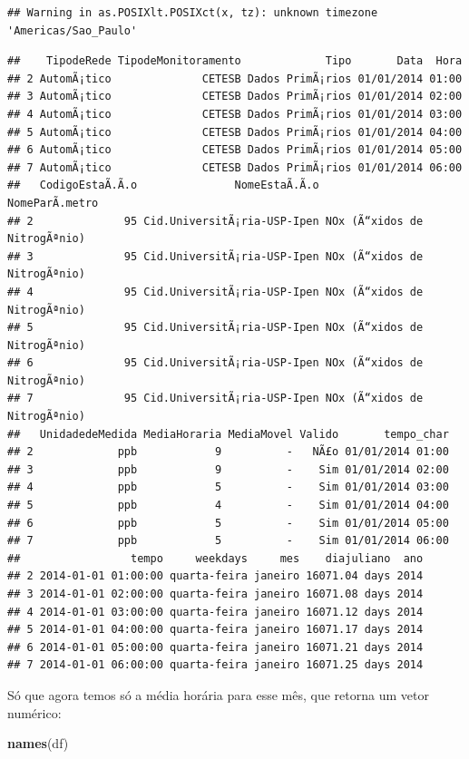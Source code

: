 \documentclass[]{book}
\newenvironment{Shaded}{\begin{snugshade}}{\end{snugshade}}
\newcommand{\KeywordTok}[1]{\textcolor[rgb]{0.13,0.29,0.53}{\textbf{#1}}}
\newcommand{\NormalTok}[1]{#1}
\theoremstyle{definition}
\theoremstyle{definition}
\theoremstyle{definition}
\theoremstyle{remark}
\begin{document}
\begin{verbatim}
## Warning in as.POSIXlt.POSIXct(x, tz): unknown timezone 'Americas/Sao_Paulo'
\end{verbatim}

\begin{verbatim}
##    TipodeRede TipodeMonitoramento             Tipo       Data  Hora
## 2 AutomÃ¡tico              CETESB Dados PrimÃ¡rios 01/01/2014 01:00
## 3 AutomÃ¡tico              CETESB Dados PrimÃ¡rios 01/01/2014 02:00
## 4 AutomÃ¡tico              CETESB Dados PrimÃ¡rios 01/01/2014 03:00
## 5 AutomÃ¡tico              CETESB Dados PrimÃ¡rios 01/01/2014 04:00
## 6 AutomÃ¡tico              CETESB Dados PrimÃ¡rios 01/01/2014 05:00
## 7 AutomÃ¡tico              CETESB Dados PrimÃ¡rios 01/01/2014 06:00
##   CodigoEstaÃ.Ã.o               NomeEstaÃ.Ã.o               NomeParÃ.metro
## 2              95 Cid.UniversitÃ¡ria-USP-Ipen NOx (Ã“xidos de NitrogÃªnio)
## 3              95 Cid.UniversitÃ¡ria-USP-Ipen NOx (Ã“xidos de NitrogÃªnio)
## 4              95 Cid.UniversitÃ¡ria-USP-Ipen NOx (Ã“xidos de NitrogÃªnio)
## 5              95 Cid.UniversitÃ¡ria-USP-Ipen NOx (Ã“xidos de NitrogÃªnio)
## 6              95 Cid.UniversitÃ¡ria-USP-Ipen NOx (Ã“xidos de NitrogÃªnio)
## 7              95 Cid.UniversitÃ¡ria-USP-Ipen NOx (Ã“xidos de NitrogÃªnio)
##   UnidadedeMedida MediaHoraria MediaMovel Valido       tempo_char
## 2             ppb            9          -   NÃ£o 01/01/2014 01:00
## 3             ppb            9          -    Sim 01/01/2014 02:00
## 4             ppb            5          -    Sim 01/01/2014 03:00
## 5             ppb            4          -    Sim 01/01/2014 04:00
## 6             ppb            5          -    Sim 01/01/2014 05:00
## 7             ppb            5          -    Sim 01/01/2014 06:00
##                 tempo     weekdays     mes    diajuliano  ano
## 2 2014-01-01 01:00:00 quarta-feira janeiro 16071.04 days 2014
## 3 2014-01-01 02:00:00 quarta-feira janeiro 16071.08 days 2014
## 4 2014-01-01 03:00:00 quarta-feira janeiro 16071.12 days 2014
## 5 2014-01-01 04:00:00 quarta-feira janeiro 16071.17 days 2014
## 6 2014-01-01 05:00:00 quarta-feira janeiro 16071.21 days 2014
## 7 2014-01-01 06:00:00 quarta-feira janeiro 16071.25 days 2014
\end{verbatim}

Só que agora temos só a média horária para esse mês, que retorna um
vetor numérico:

\begin{Shaded}
\begin{Highlighting}[]
\KeywordTok{names}\NormalTok{(df)}
\end{Highlighting}
\end{Shaded}
\end{document}
